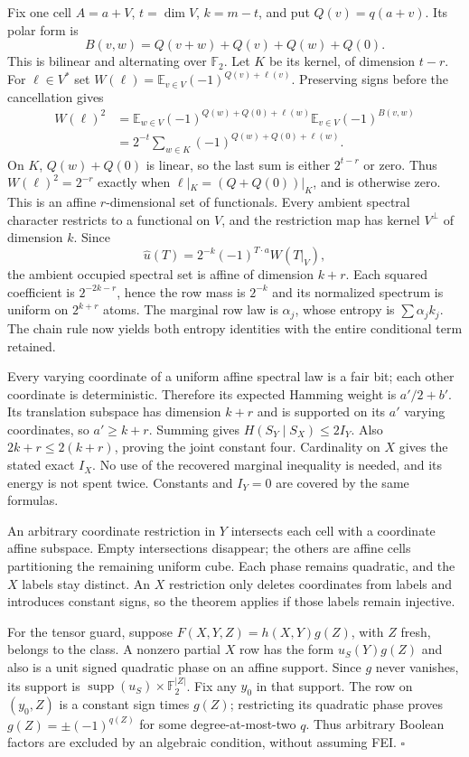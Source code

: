 \documentclass{article}
\begin{document}
Fix one cell $A=a+V$, $t=\dim V$, $k=m-t$, and put
$Q(v)=q(a+v)$. Its polar form is
\[
 B(v,w)=Q(v+w)+Q(v)+Q(w)+Q(0).
\]
This is bilinear and alternating over $\mathbb F_2$.
Let $K$ be its kernel, of dimension $t-r$. For $\ell\in V^*$ set
$W(\ell)=\mathbb E_{v\in V}(-1)^{Q(v)+\ell(v)}$.
Preserving signs before the cancellation gives
\begin{align*}
 W(\ell)^2
 &=\mathbb E_{w\in V}(-1)^{Q(w)+Q(0)+\ell(w)}
           \mathbb E_{v\in V}(-1)^{B(v,w)}\\
 &=2^{-t}\sum_{w\in K}(-1)^{Q(w)+Q(0)+\ell(w)}.
\end{align*}
On $K$, $Q(w)+Q(0)$ is linear, so the last sum is either
$2^{t-r}$ or zero. Thus $W(\ell)^2=2^{-r}$ exactly when
$\ell|_K=(Q+Q(0))|_K$, and is otherwise zero.
This is an affine $r$-dimensional set of functionals. Every ambient
spectral character restricts to a functional on $V$, and the restriction
map has kernel $V^\perp$ of dimension $k$. Since
\[
 \widehat u(T)=2^{-k}(-1)^{T\cdot a}W(T|_V),
\]
the ambient occupied spectral set is affine of dimension $k+r$.
Each squared coefficient is $2^{-2k-r}$, hence the row mass is
$2^{-k}$ and its normalized spectrum is uniform on $2^{k+r}$ atoms.
The marginal row law is $\alpha_j$, whose entropy is $\sum\alpha_jk_j$.
The chain rule now yields both entropy identities with the entire
conditional term retained.

Every varying coordinate of a uniform affine spectral law is a fair
bit; each other coordinate is deterministic. Therefore its expected
Hamming weight is $a'/2+b'$. Its translation subspace has dimension
$k+r$ and is supported on its $a'$ varying coordinates, so
$a'\ge k+r$. Summing gives
$H(S_Y\mid S_X)\le2I_Y$.
Also $2k+r\le2(k+r)$, proving the joint constant four.
Cardinality on $X$ gives the stated exact $I_X$. No use of the
recovered marginal inequality is needed, and its energy is not spent
twice. Constants and $I_Y=0$ are covered by the same formulas.

An arbitrary coordinate restriction in $Y$ intersects each cell with a
coordinate affine subspace. Empty intersections disappear; the others
are affine cells partitioning the remaining uniform cube. Each phase
remains quadratic, and the $X$ labels stay distinct. An $X$ restriction
only deletes coordinates from labels and introduces constant signs,
so the theorem applies if those labels remain injective.

For the tensor guard, suppose $F(X,Y,Z)=h(X,Y)g(Z)$, with $Z$ fresh,
belongs to the class. A nonzero partial $X$ row has the form
$u_S(Y)g(Z)$ and also is a unit signed quadratic phase on an affine
support. Since $g$ never vanishes, its support is
$\operatorname{supp}(u_S)\times\mathbb F_2^{|Z|}$. Fix any $y_0$ in
that support. The row on $(y_0,Z)$ is a constant sign times $g(Z)$;
restricting its quadratic phase proves $g(Z)=\pm(-1)^{q(Z)}$ for
some degree-at-most-two $q$. Thus arbitrary Boolean factors are
excluded by an algebraic condition, without assuming FEI.
\hfill$\square$
\end{document}
